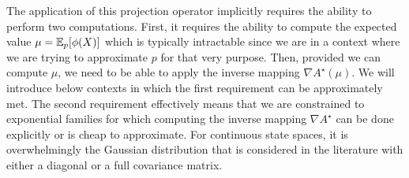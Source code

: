 The application of this projection operator implicitly requires the ability to perform two computations. First, it requires the ability to compute the expected value $\mu=\mathbb E_{p}[\phi(X)]$ which is typically intractable since we are in a context where we are trying to approximate $p$ for that very purpose. Then, provided we can compute $\mu$, we need to be able to apply the inverse mapping $\nabla A^{\star}(\mu)$. We will introduce below contexts in which the first requirement can be approximately met. The second requirement effectively means that we are constrained to exponential families for which computing the inverse mapping $\nabla A^{\star}$ can be done explicitly or is cheap to approximate. For continuous state spaces, it is overwhelmingly the Gaussian distribution that is considered in the literature with either a diagonal or a full covariance matrix. 
%
